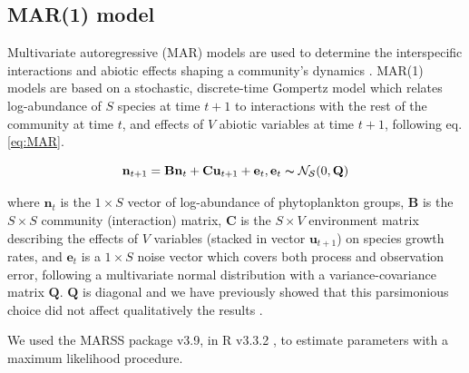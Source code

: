 \documentclass[10pt]{article}
\begin{document}
\subsection*{MAR(1) model}

Multivariate autoregressive (MAR) models are used to determine the
interspecific interactions and abiotic effects shaping a community's
dynamics \citep{ives_estimating_2003}. MAR(1) models are based
on a stochastic, discrete-time Gompertz model which relates log-abundance
of $S$ species at time $t+1$ to interactions with the rest of the
community at time $t$, and effects of $V$ abiotic variables at time
$t+1$, following eq. \ref{eq:MAR}.

\begin{equation}
\mathbf{n}_{t+1}=\mathbf{B}\mathbf{n}_{t}+\textbf{C}\textbf{u}_{t+1}+\mathbf{e}_{t},\mathbf{e}_{t}\thicksim\mathcal{{N_{S}}}(0,\mathbf{Q})\label{eq:MAR}
\end{equation}

where $\mathbf{n}_{\ensuremath{t}}$ is the $1\times S$ vector of log-abundance of phytoplankton groups, $\mathbf{B}$ is the
$S\times S$ community (interaction) matrix, $\mathbf{C}$ is the $S\times V$
environment matrix describing the effects of $V$ variables (stacked
in vector $\mathbf{u}_{t+1}$) on species growth rates, and $\mathbf{e}_{t}$
is a $1\times S$ noise vector which covers both process and observation
error, following a multivariate normal distribution with a variance-covariance
matrix $\mathbf{Q}$. $\mathbf{Q}$ is diagonal and we have previously
showed that this parsimonious choice did not affect qualitatively
the results \citep{barraquand_coastal_2018}.

We used the MARSS package \citep{holmes_analysis_2014} v3.9, in
R v3.3.2 \citep{venables_r_2013}, to estimate parameters with
a maximum likelihood procedure.
\end{document}
